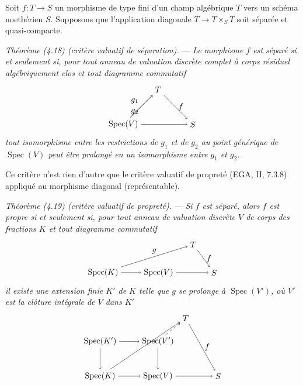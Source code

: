 \documentclass[10pt]{article}
\newcommand{\Spec}{\operatorname{Spec}}
\begin{document}
Soit $f:T\to S$ un morphisme de type fini d'un champ algébrique $T$ vers un schéma noethérien $S$. Supposons que l'application diagonale $T\to T\times_S T$ soit séparée et quasi-compacte.

\medskip
\noindent\emph{Théorème (4.18) (critère valuatif de séparation).} --- \emph{Le morphisme $f$ est séparé si et seulement si, pour tout anneau de valuation discrète complet à corps résiduel algébriquement clos et tout diagramme commutatif}
\[
\begin{tikzpicture}[baseline=(current bounding box.center)]
\node (T) at (1.5,1.5) {$T$};
\node (V) at (0,0) {$\Spec(V)$};
\node (S) at (3,0) {$S$};
\draw[->] (V) -- node[above left] {$g_1$} (T);
\draw[->] (V) -- node[below left] {$g_2$} (T);
\draw[->] (V) -- (S);
\draw[->] (T) -- node[right] {$f$} (S);
\end{tikzpicture}
\]
\emph{tout isomorphisme entre les restrictions de $g_1$ et de $g_2$ au point générique de $\Spec(V)$ peut être prolongé en un isomorphisme entre $g_1$ et $g_2$.}

Ce critère n'est rien d'autre que le critère valuatif de propreté (EGA, II, 7.3.8) appliqué au morphisme diagonal (représentable).

\medskip
\noindent\emph{Théorème (4.19) (critère valuatif de propreté).} --- \emph{Si $f$ est séparé, alors $f$ est propre si et seulement si, pour tout anneau de valuation discrète $V$ de corps des fractions $K$ et tout diagramme commutatif}
\[
\begin{tikzpicture}[baseline=(current bounding box.center)]
\node (K) at (0,0) {$\Spec(K)$};
\node (V) at (2.4,0) {$\Spec(V)$};
\node (T) at (3.9,1.2) {$T$};
\node (S) at (4.8,0) {$S$};
\draw[->] (K) -- (V);
\draw[->] (V) -- (S);
\draw[->] (T) -- node[right] {$f$} (S);
\draw[->] (K) -- node[above] {$g$} (T);
\end{tikzpicture}
\]
\emph{il existe une extension finie $K'$ de $K$ telle que $g$ se prolonge à $\Spec(V')$, où $V'$ est la clôture intégrale de $V$ dans $K'$}
\[
\begin{tikzpicture}[baseline=(current bounding box.center)]
\node (Kp) at (0,1.5) {$\Spec(K')$};
\node (Vp) at (2.5,1.5) {$\Spec(V')$};
\node (T) at (3.7,2.5) {$T$};
\node (K) at (0,0) {$\Spec(K)$};
\node (V) at (2.5,0) {$\Spec(V)$};
\node (S) at (5.1,0) {$S$};
\draw[->] (Kp) -- (Vp);
\draw[->] (K) -- (V);
\draw[->] (Kp) -- (K);
\draw[->] (Vp) -- (V);
\draw[->] (V) -- (S);
\draw[->] (T) -- node[right] {$f$} (S);
\draw[->] (K) -- (T);
\draw[->,dashed] (Vp) -- (T);
\end{tikzpicture}
\]
\end{document}
